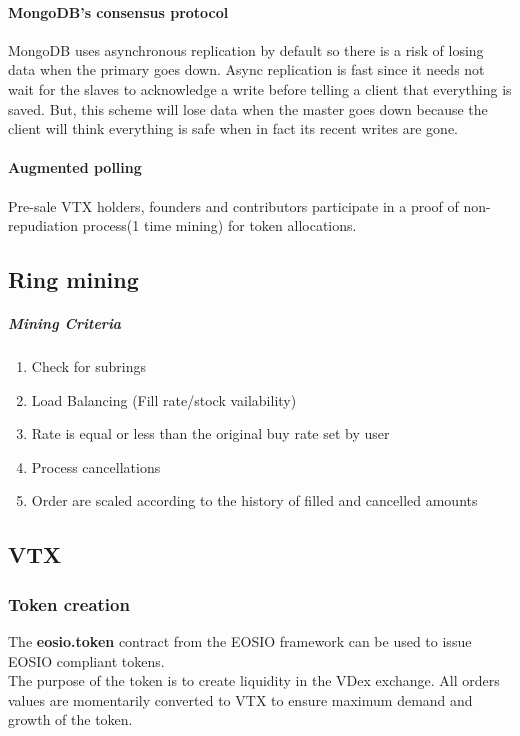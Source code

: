 \documentclass[]{article}
\begin{document}
\paragraph{MongoDB's consensus protocol}
MongoDB uses asynchronous replication by default so there is a risk of losing data when the primary goes down.
Async replication is fast since it needs not wait for the slaves to
acknowledge a write before telling a client that everything is saved.
But, this scheme will lose data when the master goes down because the
client will think everything is safe when in fact its recent writes
are gone. 

\paragraph{Augmented polling}
Pre-sale VTX holders, founders and contributors participate in a proof of non-repudiation process(1 time mining) for token allocations.


\subsection{Ring mining}
\subparagraph{Mining Criteria}
		\begin{enumerate}
		\item Check for subrings
		\item Load Balancing (Fill rate/stock vailability)
		\item Rate is equal or less than the original buy rate set by user
		\item Process cancellations
		\item Order are scaled according to the history of filled and cancelled amounts 
		\end{enumerate}		

\subsection{VTX}

\subsubsection{Token creation}
The \textbf{eosio.token} contract from the EOSIO framework can be used to issue EOSIO compliant tokens.\\
The purpose of the token is to create liquidity in the VDex exchange.
All orders values are momentarily converted to VTX to ensure maximum demand and growth of the token.\\ 
\end{document}

